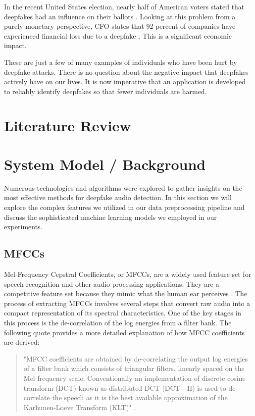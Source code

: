 \documentclass[conference]{IEEEtran}
\begin{document}
In the recent United States election, nearly half of American voters stated that deepfakes had an influence on their ballots \cite{b1}. Looking at this problem from a purely monetary perspective, CFO states that 92 percent of companies have experienced financial loss due to a deepfake \cite{b4}. This is a significant economic impact. 

These are just a few of many examples of individuals who have been hurt by deepfake attacks. There is no question about the negative impact that deepfakes actively have on our lives. It is now imperative that an application is developed to reliably identify deepfakes so that fewer individuals are harmed. 

\section{Literature Review}

\section{System Model / Background}

Numerous technologies and algorithms were explored to gather insights on the most effective methods for deepfake audio detection. In this section we will explore the complex features we utilized in our data preprocessing pipeline and discuss the sophisticated machine learning models we employed in our experiments. 

\subsection{MFCCs}

Mel-Frequency Cepstral Coefficients, or MFCCs, are a widely used feature set for speech recognition and other audio processing applications. They are a competitive feature set because they mimic what the human ear perceives \cite{9996362}. The process of extracting MFCCs involves several steps that convert raw audio into a compact representation of its spectral characteristics. One of the key stages in this process is the de-correlation of the log energies from a filter bank. The following quote provides a more detailed explanation of how MFCC coefficients are derived:

\begin{quote}
  "MFCC coefficients are obtained by de-correlating the output log
  energies of a filter bank which consists of triangular filters, linearly spaced on the Mel frequency scale.
  Conventionally an implementation of discrete cosine transform (DCT) known as distributed DCT (DCT - II) is
  used to de-correlate the speech as it is the best available approximation of the Karhunen-Loeve Transform
  (KLT)" \cite{5709752}.
\end{quote}
\end{document}
